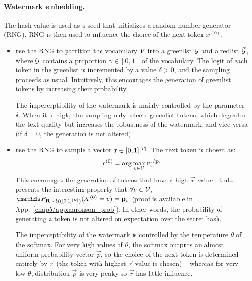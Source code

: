 \paragraph*{Watermark embedding.} 
The hash value is used as a seed that initializes a random number generator (RNG).
RNG is then used to influence the choice of the next token $x^{(0)}$.
\begin{itemize}
    \item \citet{kirchenbauer2023watermark} use the RNG to partition the vocabulary $\mathcal{V}$ into a greenlist $\mathcal{G}$ and a redlist $\bar{\mathcal{G}}$, where $\mathcal{G}$ contains a proportion $\gamma \in [0,1]$ of the vocabulary.
    The logit of each token in the greenlist is incremented by a value $\delta>0$, and the sampling proceeds as usual.
    Intuitively, this encourages the generation of greenlist tokens by increasing their probability.

    The imperceptibility of the watermark is mainly controlled by the parameter $\delta$.
    When it is high, the sampling only selects greenlist tokens, which  degrades the text quality but increases the robustness of the watermark, and vice versa (if $\delta=0$, the generation is not altered).

    \item \citet{aaronson2023watermarking} use the RNG to sample a vector $\mathbf{r}\in[0,1]^{|\mathcal{V}|}$.
    The next token is chosen as:
    \begin{equation}
        x^{(0)} = \arg \max_{v \in \mathcal{V} } \mathbf{r}_v^{1/\mathbf{p}_v}
    \end{equation}
    This encourages the generation of tokens that have a high $\vec{r}$ value.
    It also presents the interesting property that $\forall v\in \mathcal{V}$, $\Prob_{\vec{R}\,\sim\,\mathcal{U}([0,1]^{|\V|})} (X^{(0)}=v) = \vec{p}_v$ (proof is available in App.~\ref{chap5/app:aaronson_prob}).
    In other words, the probability of generating a token is not altered on expectation over the secret hash.

    The imperceptibility of the watermark is controlled by the temperature $\theta$ of the softmax.
    For very high values of $\theta$, the softmax outputs an almost uniform probability vector $\vec{p}$, so the choice of the next token is determined entirely by $\vec{r}$ (the token with highest $\vec{r}$ value is chosen) -- whereas for very low $\theta$, distribution $\vec{p}$ is very peaky so $\vec{r}$ has little influence.
\end{itemize}




